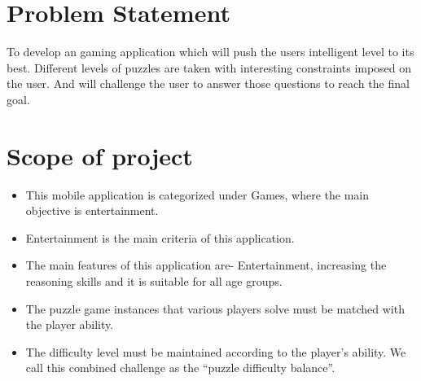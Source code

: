 \section{Problem Statement}
\hspace{1cm}To develop an gaming application which will push the users intelligent level to its best. Different levels of puzzles are taken with interesting constraints imposed on the user. And will challenge the user to answer those questions to reach the final goal.\\

\section{Scope of project}
\hspace{1cm}	
\begin{itemize}
\item \textbf {}This mobile application is categorized under Games, where the main objective is entertainment. 
\item \textbf {}Entertainment is the main criteria of this application.
\item \textbf {}The main features of this application are- Entertainment, increasing the reasoning skills and it is suitable for all age groups.
\item \textbf {}The puzzle game instances that various players solve must be matched with the player ability.
\item \textbf {}The difficulty level must be maintained according to the player’s ability. We call this combined challenge as the “puzzle difficulty balance”.
\end{itemize}


